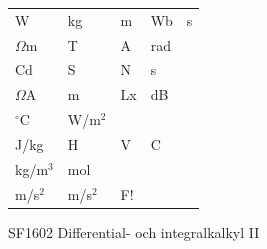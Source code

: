 \documentclass[a6paper, 10pt, twoside]{article}
\begin{document}
\noindent
{}
\small
\begin{center}
\end{center}
\vspace{-10pt}
\begin{table}[!h]
\begin{lyrics}
\begin{tabularx}{0.85\textwidth}{X X X X X}
W&kg&m&Wb&s
\vspace{3pt} \\
$\Omega$m&T&A&rad
\vspace{3pt} \\
Cd&S&N&s
\vspace{3pt} \\
$\Omega$A&m&Lx&dB
\vspace{3pt} \\
$^{\circ}$C&W/m$^2$ &
\vspace{5pt} \\
J/kg&H&V&C
\vspace{3pt} \\
kg/m$^3$ & mol
\vspace{3pt} \\
m/s$^2$&m/s$^2$&F!
\end{tabularx}
\end{lyrics}
\end{table}
\begin{center}
\footnotesize{SF1602 Differential- och integralkalkyl II}\\
\end{center}
\end{document}
